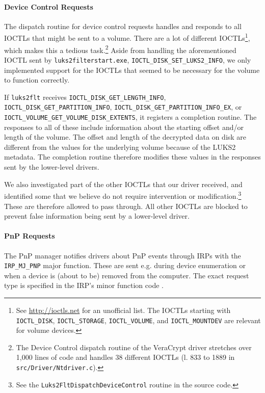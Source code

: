 \paragraph{Device Control Requests} The dispatch routine for device control requests handles and responds to all IOCTLs that might be sent to a volume. There are a lot of different IOCTLs\footnote{\label{fn:ourapproach.final.ioctls} See \url{http://ioctls.net} for an unofficial list. The IOCTLs starting with \texttt{IOCTL\_DISK}, \texttt{IOCTL\_STORAGE}, \texttt{IOCTL\_VOLUME}, and \texttt{IOCTL\_MOUNTDEV} are relevant for volume devices.}, which makes this a tedious task.\footnote{\label{fn:ourapproach.final.veracryptioctls} The Device Control dispatch routine of the VeraCrypt driver stretches over 1,000 lines of code and handles 38 different IOCTLs (l. 833 to 1889 in \texttt{src/Driver/Ntdriver.c}).} Aside from handling the aforementioned IOCTL sent by \texttt{luks2filterstart.exe}, \texttt{IOCTL\_DISK\_SET\_LUKS2\_INFO}, we only implemented support for the IOCTLs that seemed to be necessary for the volume to function correctly.

If \texttt{luks2flt} receives \texttt{IOCTL\_DISK\_GET\_LENGTH\_INFO}, \texttt{IOCTL\_DISK\_GET\_PARTITION\_INFO}, \texttt{IOCTL\_DISK\_GET\_PARTITION\_INFO\_EX}, or \texttt{IOCTL\_VOLUME\_GET\_VOLUME\_DISK\_EXTENTS}, it registers a completion routine. The responses to all of these include information about the starting offset and/or length of the volume. The offset and length of the decrypted data on disk are different from the values for the underlying volume because of the LUKS2 metadata. The completion routine therefore modifies these values in the responses sent by the lower-level drivers.

We also investigated part of the other IOCTLs that our driver received, and identified some that we believe do not require intervention or modification.\footnote{\label{fn:ourapproach.final.unproblematicioctls} See the \texttt{Luks2FltDispatchDeviceControl} routine in the source code.} These are therefore allowed to pass through. All other IOCTLs are blocked to prevent false information being sent by a lower-level driver.

\paragraph{PnP Requests} The PnP manager notifies drivers about PnP events through IRPs with the \texttt{IRP\_MJ\_PNP} major function. These are sent e.g. during device enumeration or when a device is (about to be) removed from the computer. The exact request type is specified in the IRP's minor function code \cite{Kerneldriver}.

